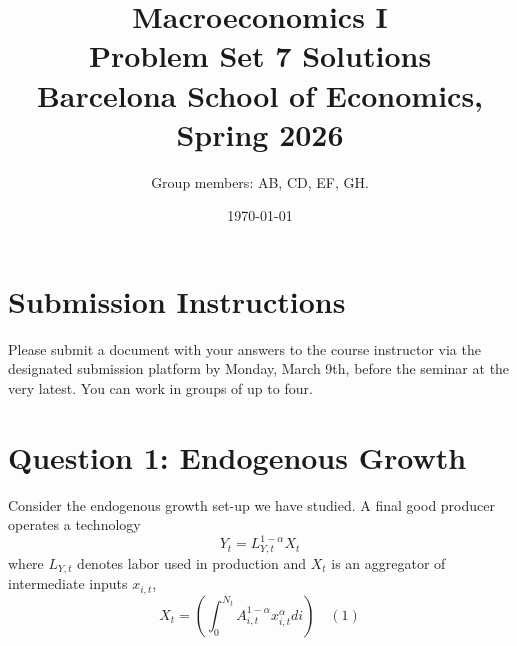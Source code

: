 \documentclass[11pt]{exam}
\title{\vspace*{-4em}Macroeconomics I\\ Problem Set 7
	\ifprintanswers
	{\color{red}Solutions}
	\fi
\\	
{\normalsize Barcelona School of Economics, Spring 2026} \\
\duedate}
\author{Group members: AB, CD, EF, GH.}
\date{\today}
\begin{document}
\maketitle
\vspace*{-1em}

\section*{Submission Instructions}
Please submit a document with your answers to the course instructor via the designated submission platform by Monday, March 9th, before the seminar at the very latest. You can work in groups of up to four.

\section{Question 1: Endogenous Growth}

Consider the endogenous growth set-up we have studied. A final good producer operates a technology
\[
	Y_{t}=L_{Y,t}^{1-\alpha}X_{t}
\]
where $L_{Y,t}$ denotes labor used in production and $X_{t}$ is an aggregator of intermediate inputs $x_{i,t}$,
\[
	X_{t}=\left(\int_{0}^{N_{t}}A_{i,t}^{1-\alpha}x_{i,t}^{\alpha}di\right) \quad (1)
\]
\end{document}
